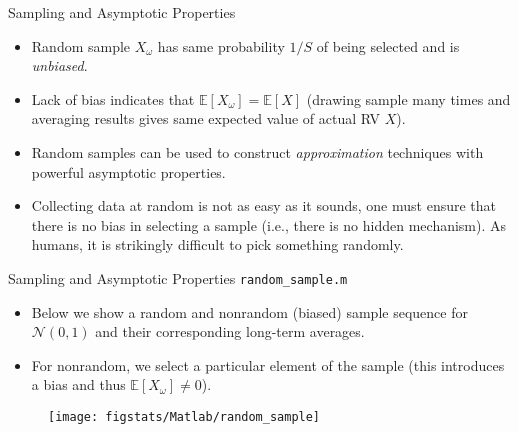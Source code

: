 \documentclass[handout,9pt]{beamer}
\begin{document}
%
\begin{frame}{Sampling and Asymptotic Properties}

\begin{block}{}
\begin{itemize}
\setlength{\itemsep}{10pt}
\item Random sample $X_\omega$ has same probability $1/S$ of being selected and is {\em unbiased}. 

\item Lack of bias indicates that $\mathbb{E}[X_\omega]=\mathbb{E}[X]$ (drawing sample many times and averaging results gives same expected value of actual RV $X$). 

\item Random samples can be used to construct {\em approximation} techniques with powerful asymptotic properties.

\item Collecting data at random is not as easy as it sounds, one must ensure that there is no bias in selecting a sample (i.e., there is no hidden mechanism).  As humans, it is strikingly difficult to pick something randomly. 

\end{itemize}
\end{block}

\end{frame}

%
\begin{frame}{Sampling and Asymptotic Properties \footnotesize{\texttt{random\_sample.m}}}
\begin{itemize}
\item Below we show a random and nonrandom (biased) sample sequence for $\mathcal{N}(0,1)$ and their corresponding long-term  averages. 
\item For nonrandom, we select a particular element of the sample (this introduces a bias and thus $\mathbb{E}[X_\omega]\neq 0$). 
\end{itemize}
\begin{figure}[!htb]
    \centering
	\texttt{[image: figstats/Matlab/random\_sample]}
\end{figure}

\end{frame}
\end{document}
